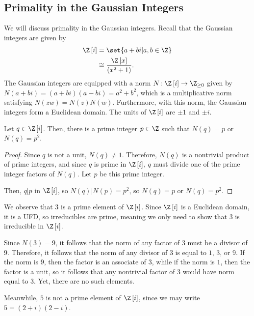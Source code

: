 \documentclass[10pt]{mypackage}
\begin{document}
\subsection{Primality in the Gaussian Integers}%
We will discuss primality in the Gaussian integers. Recall that the Gaussian integers are given by
\begin{align*}
  \Z\left[ i \right] &= \set{a + bi | a,b\in \Z}\\
                     &\cong \frac{\Z\left[ x \right]}{\left( x^2 + 1 \right)}.
\end{align*}
The Gaussian integers are equipped with a norm $N\colon \Z\left[ i \right]\rightarrow \Z_{\geq 0}$ given by $N\left( a+bi \right) = \left( a+bi \right)\left( a-bi \right) = a^2 + b^2$, which is a multiplicative norm satisfying $N\left( zw \right) = N\left( z \right)N\left( w \right)$. Furthermore, with this norm, the Gaussian integers form a Euclidean domain. The units of $\Z\left[ i \right]$ are $\pm 1$ and $\pm i$.
\begin{lemma}
  Let $q\in \Z\left[ i \right]$. Then, there is a prime integer $p\in \Z$ such that $N\left( q \right) = p$ or $N\left( q \right) = p^2$.
\end{lemma}
\begin{proof}
  Since $q$ is not a unit, $N\left( q \right)\neq 1$. Therefore, $N\left( q \right)$ is a nontrivial product of prime integers, and since $q$ is prime in $\Z\left[ i \right]$, $q$ must divide one of the prime integer factors of $N\left( q \right)$. Let $p$ be this prime integer.

  Then, $q | p$ in $\Z\left[ i \right]$, so $N\left( q \right) | N\left( p \right) = p^2$, so $N\left( q \right) = p$ or $N\left( q \right) = p^2$.
\end{proof}
\begin{example}
  We observe that $3$ is a prime element of $\Z\left[ i \right]$. Since $\Z\left[ i \right]$ is a Euclidean domain, it is a UFD, so irreducibles are prime, meaning we only need to show that $3$ is irreducible in $\Z\left[ i \right]$.

  Since $N\left( 3 \right) = 9$, it follows that the norm of any factor of $3$ must be a divisor of $9$. Therefore, it follows that the norm of any divisor of $3$ is equal to $1$, $3$, or $9$. If the norm is $9$, then the factor is an associate of $3$, while if the norm is $1$, then the factor is a unit, so it follows that any nontrivial factor of $3$ would have norm equal to $3$. Yet, there are no such elements.

  Meanwhile, $5$ is not a prime element of $\Z\left[ i \right]$, since we may write $5 = \left( 2+i \right)\left( 2-i \right)$.
\end{example}
\end{document}
